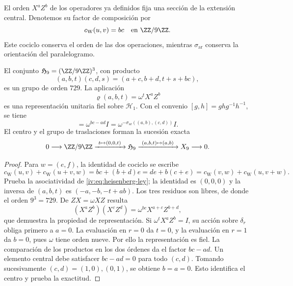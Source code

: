 El orden \(X^aZ^b\) de los operadores ya definidos fija una sección
de la extensión central. Denotemos su factor de composición por
\begin{equation}
 c_{\mathrm W}(u,v)=bc\quad\text{en }\ZZ/9\ZZ.
 \label{iv:eq:weyl-cociclo-polarizado}
\end{equation}
Este cociclo conserva el orden de las dos operaciones, mientras
\(\sigma_{\mathrm{ar}}\) conserva la orientación del paralelogramo.

\begin{proposition}
\label{iv:prop:heisenberg-orientado}
El conjunto \(\mathfrak H_9=(\ZZ/9\ZZ)^3\), con producto
\begin{equation}
 (a,b,t)(c,d,s)=(a+c,b+d,t+s+bc),
 \label{iv:eq:heisenberg-ley}
\end{equation}
es un grupo de orden \(729\). La aplicación
\[
 \varrho(a,b,t)=\omega^tX^aZ^b
\]
es una representación unitaria fiel sobre \(\mathcal H_1\).
Con el convenio \([g,h]=ghg^{-1}h^{-1}\), se tiene
\begin{equation}
 [\varrho(a,b,0),\varrho(c,d,0)]
 =\omega^{bc-ad}I
 =\omega^{-\sigma_{\mathrm{ar}}((a,b),(c,d))}I.
 \label{iv:eq:weyl-conmutador-orientado}
\end{equation}
El centro y el grupo de traslaciones forman la sucesión exacta
\[
 0\longrightarrow\ZZ/9\ZZ
 \xrightarrow{\ t\mapsto(0,0,t)\ }\mathfrak H_9
 \xrightarrow{\ (a,b,t)\mapsto(a,b)\ }X_9
 \longrightarrow0.
\]
\end{proposition}
\begin{proof}
Para \(w=(e,f)\), la identidad de cociclo se escribe
\[
 c_{\mathrm W}(u,v)+c_{\mathrm W}(u+v,w)
 =bc+(b+d)e
 =de+b(c+e)
 =c_{\mathrm W}(v,w)+c_{\mathrm W}(u,v+w).
\]
Prueba la asociatividad de \eqref{iv:eq:heisenberg-ley}; la identidad
es \((0,0,0)\) y la inversa de \((a,b,t)\) es
\((-a,-b,-t+ab)\). Los tres residuos son libres, de donde el orden
\(9^3=729\). De \(ZX=\omega XZ\) resulta
\[
 (X^aZ^b)(X^cZ^d)=\omega^{bc}X^{a+c}Z^{b+d},
\]
que demuestra la propiedad de representación. Si
\(\omega^tX^aZ^b=I\), su acción sobre \(\delta_r\) obliga primero
a \(a=0\). La evaluación en \(r=0\) da \(t=0\), y la
evaluación en \(r=1\) da \(b=0\), pues \(\omega\) tiene orden
nueve. Por ello la representación es fiel. La comparación de los
productos en los dos órdenes da el factor \(bc-ad\).
Un elemento central debe satisfacer \(bc-ad=0\) para todo \((c,d)\).
Tomando sucesivamente \((c,d)=(1,0),(0,1)\), se obtiene
\(b=a=0\). Esto identifica el centro y prueba la exactitud.
\end{proof}

